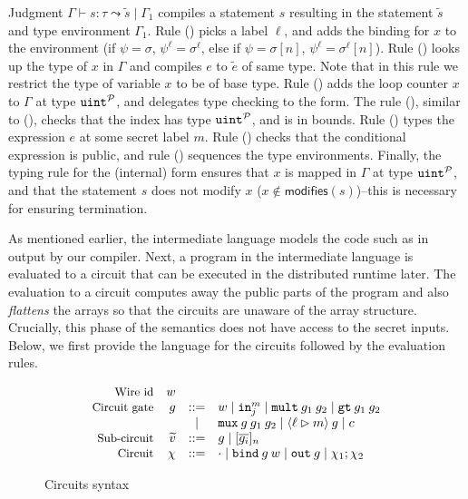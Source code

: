 Judgment $\Gamma \vdash s : \tau \leadsto \widetilde{s} \mid \Gamma_{1}$
compiles a statement $s$ resulting in the statement $\widetilde{s}$
and type environment $\Gamma_{1}$. Rule ({}) picks a label
$\ell$, and adds the binding for $x$ to the environment (if $\psi =
\sigma$, $\psi^\ell = \sigma^\ell$, else if $\psi = \sigma[n]$,
$\psi^\ell = \sigma^\ell[n]$).
Rule ({}) looks up the type of $x$ in $\Gamma$ and compiles $e$ to $\tilde{e}$ of same type.
Note that in this rule we restrict the type of variable $x$ to be of base type.
Rule ({}) adds the loop counter $x$ to $\Gamma$ at type
${\mathtt{uint}}^{\mathcal{P}}$, and delegates type checking to the
 form. The rule ({}), similar to ({}),
checks that the index has type ${\mathtt{uint}}^{\mathcal{P}}$, and is in
bounds. Rule ({})
types the expression $e$ at some secret label $m$. Rule ({})
checks that the conditional expression is public, and rule
({}) sequences the type environments. Finally, the typing
rule for the (internal)  form ensures that $x$ is mapped in
$\Gamma$ at type ${\mathtt{uint}}^{\mathcal{P}}$, and that the statement $s$
does not modify $x$ ($x \notin
\mathsf{modifies}(s)$)--this is necessary for ensuring termination.



As mentioned earlier, the intermediate language models the code such
as in  output by our compiler.
Next, a program in the intermediate language is evaluated to a circuit
that can be executed in the distributed runtime later. The evaluation
to a circuit computes away the public parts of the program and also
\emph{flattens} the arrays so that the circuits are unaware of the
array structure.
Crucially, this phase of the semantics does not have access to the
secret inputs.
Below, we first provide the language for the circuits followed by the
evaluation rules.


\begin{figure}
  \footnotesize
  \[
  \begin{array}{rrcl}
    \text{\small{Wire id}} & w &&\\
    \text{\small{Circuit gate}} & {g} & ::= & w \mid {\ensuremath{\mathtt{in}}}^{m}_{j} \mid {\ensuremath{\mathtt{mult}}}\:{g}_1\:{g}_{2} \mid {\ensuremath{\mathtt{gt}}}\:{g}_{1}\:{g}_{2}\\
    & & \mid & {\mathtt{mux}}\:{g}\:{g}_{1}\:{g}_{2} \mid \langle \ell
    \rhd m \rangle\:{g} \mid c\\
    \text{\small{Sub-circuit}} & \widetilde{v} & ::= & {g} \mid [\overline{{g}_{i}}]_{n}\\
    \text{\small{Circuit}} & \chi & ::= & \cdot \mid {\ensuremath{\mathtt{bind}}}\:{g}\:w \mid {\ensuremath{\mathtt{out}}}\:{g} \mid \chi_{1}; \chi_{2}
  \end{array}
  \]
\caption{Circuits  syntax}
\label{fig:circuits}
\end{figure}






